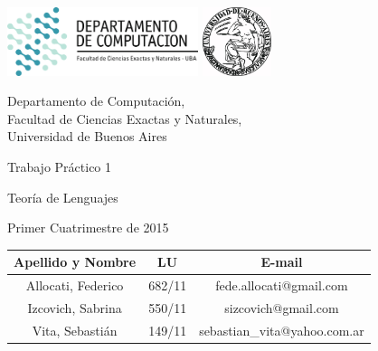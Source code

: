 \documentclass[a4paper, 10pt, twoside]{article}
\newcommand{\titulo}{Trabajo Práctico 1}
\newcommand{\materia}{Teoría de Lenguajes}
\newcommand{\cuatrimestre}{Primer Cuatrimestre de 2015}
\begin{document}


\thispagestyle{caratula}

\begin{center}

\includegraphics[height=2cm]{DC.png} 
\hfill
\includegraphics[height=2cm]{UBA.jpg} 

\vspace{2cm}

Departamento de Computación,\\
Facultad de Ciencias Exactas y Naturales,\\
Universidad de Buenos Aires

\vspace{4cm}

\begin{Huge}
\titulo
\end{Huge}

\vspace{0.5cm}

\begin{Large}
\materia
\end{Large}

\vspace{1cm}

\cuatrimestre

\vspace{4cm}

\begin{tabular}{|c|c|c|}
\hline
Apellido y Nombre & LU & E-mail\\
\hline
Allocati, Federico  & 682/11 & fede.allocati@gmail.com\\
Izcovich, Sabrina & 550/11 & sizcovich@gmail.com\\
Vita, Sebastián & 149/11 & sebastian\_vita@yahoo.com.ar\\
\hline
\end{tabular}

\end{center}
\end{document}
